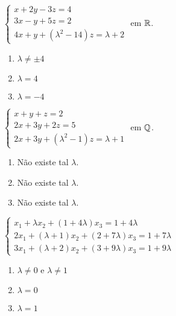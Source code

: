\documentclass[12pt]{exam}
\begin{document}
\begin{exercicio}
    $
        \begin{cases}
            x + 2y - 3z = 4\\
            3x - y + 5z = 2\\
            4x + y + (\lambda^2 - 14)z = \lambda + 2
        \end{cases}
    $
    em $\mathbb{R}$.
    \begin{solucao}
        \begin{enumerate}[label={\alph*})]
            \item $\lambda \ne \pm 4$

            \item $\lambda = 4$

            \item $\lambda = -4$
    \end{enumerate}
  \end{solucao}
\end{exercicio}

\begin{exercicio}
    $
        \begin{cases}
            x + y + z = 2\\
            2x + 3y + 2z = 5\\
            2x + 3y + (\lambda^2 - 1)z = \lambda + 1
        \end{cases}
    $
    em $\mathbb{Q}$.
    \begin{solucao}
        \begin{enumerate}[label={\alph*})]
            \item Não existe tal $\lambda$.

            \item Não existe tal $\lambda$.

            \item Não existe tal $\lambda$.
        \end{enumerate}
    \end{solucao}
\end{exercicio}

\begin{exercicio}
    $
        \begin{cases}
            x_1 + \lambda x_2 + (1 + 4\lambda )x_3 = 1 + 4\lambda \\
            2x_1 + (\lambda  + 1)x_2 + (2 + 7\lambda )x_3 = 1 + 7\lambda \\
            3x_1 + (\lambda  + 2)x_2 + (3 + 9\lambda )x_3 = 1 + 9\lambda
        \end{cases}
    $
    \begin{solucao}
        \begin{enumerate}[label={\alph*})]
            \item $\lambda \ne 0$ e $\lambda \ne 1$

            \item $\lambda = 0$

            \item $\lambda = 1$
        \end{enumerate}
    \end{solucao}
\end{exercicio}
\end{document}
